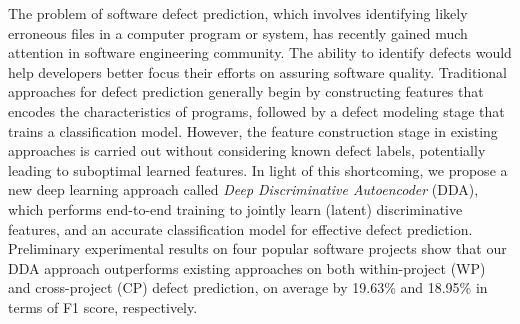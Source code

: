The problem of software defect prediction, which involves identifying likely erroneous files in a computer program or system, has recently gained much attention in software engineering community. The ability to identify defects would help developers better focus their efforts on assuring software quality. Traditional approaches for defect prediction generally begin by constructing features that encodes the characteristics of programs, followed by a defect modeling stage that trains a classification model. However, the feature construction stage in existing approaches is carried out without considering known defect labels, potentially leading to suboptimal learned features. In light of this shortcoming, we propose a new deep learning approach called \emph{Deep Discriminative Autoencoder} (DDA), which performs end-to-end training to jointly learn (latent) discriminative features, and an accurate classification model for effective defect prediction. Preliminary experimental results on four popular software projects show that our DDA approach outperforms existing approaches on both within-project (WP) and cross-project (CP) defect prediction, on average by 19.63\% and 18.95\% in terms of F1 score, respectively.




